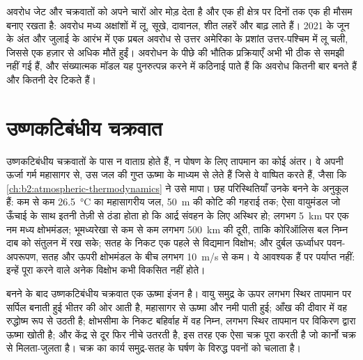 अवरोध जेट और चक्रवातों को अपने चारों ओर मोड़ देता है और एक ही क्षेत्र पर दिनों तक एक ही मौसम बनाए रखता है:
अवरोध मध्य अक्षांशों में लू, सूखे, दावानल, शीत लहरें और बाढ़ लाते हैं। 2021 के जून के अंत और
जुलाई के आरंभ में एक प्रबल अवरोध से उत्तर अमेरिका के प्रशांत उत्तर-पश्चिम में लू चली,
जिससे एक हज़ार से अधिक मौतें हुईं। अवरोधन के पीछे की भौतिक
प्रक्रियाएँ अभी भी ठीक से समझी नहीं गई हैं, और संख्यात्मक मॉडल यह पुनरुत्पन्न करने में कठिनाई पाते हैं कि अवरोध
कितनी बार बनते हैं और कितनी देर टिकते हैं।

\section{उष्णकटिबंधीय चक्रवात}\label{sec:b2:weather-systems:tropical}

उष्णकटिबंधीय चक्रवातों के पास न वाताग्र होते हैं, न पोषण के लिए तापमान का कोई अंतर। वे अपनी ऊर्जा
गर्म महासागर से, उस जल की गुप्त ऊष्मा के माध्यम से लेते हैं जिसे वे वाष्पित करते हैं, जैसा कि \cref{ch:b2:atmospheric-thermodynamics}
ने उसे मापा। छह परिस्थितियाँ उनके बनने के अनुकूल हैं: कम से कम \qty{26.5}{\celsius} का महासागरीय जल,
\qty{50}{m} की कोटि की गहराई तक; ऐसा वायुमंडल जो ऊँचाई के साथ इतनी तेज़ी से ठंडा होता हो कि
आर्द्र संवहन के लिए अस्थिर हो; लगभग \qty{5}{km} पर एक नम मध्य क्षोभमंडल; भूमध्यरेखा से
कम से कम लगभग \qty{500}{km} की दूरी, ताकि कोरिऑलिस बल निम्न दाब को संतुलन में
रख सके; सतह के निकट एक पहले से विद्यमान विक्षोभ; और दुर्बल ऊर्ध्वाधर पवन-अपरूपण, सतह और ऊपरी
क्षोभमंडल के बीच लगभग \qty{10}{m/s} से कम। ये आवश्यक हैं पर
पर्याप्त नहीं: इन्हें पूरा करने वाले अनेक विक्षोभ कभी विकसित नहीं होते।

बनने के बाद उष्णकटिबंधीय चक्रवात एक ऊष्मा इंजन है। वायु समुद्र के ऊपर लगभग
स्थिर तापमान पर सर्पिल बनाती हुई भीतर की ओर आती है, महासागर से ऊष्मा और नमी पाती हुई; आँख की दीवार में वह
रुद्धोष्म रूप से उठती है; क्षोभसीमा के निकट बहिर्वाह में वह निम्न, लगभग स्थिर तापमान पर विकिरण द्वारा
ऊष्मा खोती है; और केंद्र से दूर फिर नीचे उतरती है, इस तरह एक ऐसा चक्र पूरा करती है जो
कार्नो चक्र से मिलता-जुलता है। चक्र का कार्य समुद्र-सतह के घर्षण के विरुद्ध पवनों को
चलाता है।

